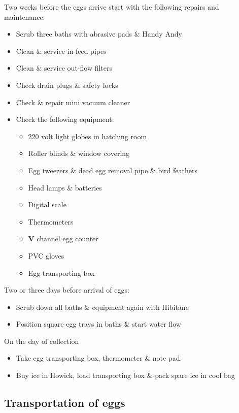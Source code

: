 Two weeks before the eggs arrive start with the following repairs and maintenance:  \marginpar{-2 \W}
\begin{itemize}
   \item Scrub three baths with abrasive pads \& Handy Andy
   \item Clean \& service in-feed pipes
   \item Clean \& service out-flow filters
   \item Check drain plugs \& safety locks
   \item Check \& repair mini vacuum cleaner
   \item Check the following equipment:
   \begin{itemize}
      \item 220 volt light globes in hatching room
      \item Roller blinds \& window covering
      \item Egg tweezers \& dead egg removal pipe \& bird feathers
      \item Head lamps \& batteries
      \item Digital scale
      \item Thermometers
      \item {\bf V} channel egg counter
      \item PVC gloves
      \item Egg transporting box
   \end{itemize}
\end{itemize}
   
Two or three days before arrival of eggs: \marginpar{-0.5 \W}
\begin{itemize}
   \item Scrub down all baths \& equipment again with Hibitane
   \item Position square egg trays in baths \& start water flow
\end{itemize}

On the day of collection \marginpar{0 \W}
\begin{itemize}
      \item Take egg transporting box, thermometer \& note pad.
      \item Buy ice in Howick, load transporting box \& pack spare ice in cool bag
\end{itemize}


\subsection{Transportation of eggs}

